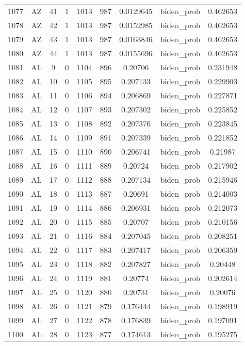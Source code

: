 \documentclass[12pt,a4paper]{article}
\begin{document}
\begin{tabular}{r|cccccccc}
	1077 & AZ & 41 & 1 & 1013 & 987 & 0.0129645 & biden\_prob & 0.462653 \\
	1078 & AZ & 42 & 1 & 1013 & 987 & 0.0152985 & biden\_prob & 0.462653 \\
	1079 & AZ & 43 & 1 & 1013 & 987 & 0.0163846 & biden\_prob & 0.462653 \\
	1080 & AZ & 44 & 1 & 1013 & 987 & 0.0155696 & biden\_prob & 0.462653 \\
	1081 & AL & 9 & 0 & 1104 & 896 & 0.20706 & biden\_prob & 0.231948 \\
	1082 & AL & 10 & 0 & 1105 & 895 & 0.207133 & biden\_prob & 0.229903 \\
	1083 & AL & 11 & 0 & 1106 & 894 & 0.206869 & biden\_prob & 0.227871 \\
	1084 & AL & 12 & 0 & 1107 & 893 & 0.207302 & biden\_prob & 0.225852 \\
	1085 & AL & 13 & 0 & 1108 & 892 & 0.207376 & biden\_prob & 0.223845 \\
	1086 & AL & 14 & 0 & 1109 & 891 & 0.207339 & biden\_prob & 0.221852 \\
	1087 & AL & 15 & 0 & 1110 & 890 & 0.206741 & biden\_prob & 0.21987 \\
	1088 & AL & 16 & 0 & 1111 & 889 & 0.20724 & biden\_prob & 0.217902 \\
	1089 & AL & 17 & 0 & 1112 & 888 & 0.207134 & biden\_prob & 0.215946 \\
	1090 & AL & 18 & 0 & 1113 & 887 & 0.20691 & biden\_prob & 0.214003 \\
	1091 & AL & 19 & 0 & 1114 & 886 & 0.206931 & biden\_prob & 0.212073 \\
	1092 & AL & 20 & 0 & 1115 & 885 & 0.20707 & biden\_prob & 0.210156 \\
	1093 & AL & 21 & 0 & 1116 & 884 & 0.207045 & biden\_prob & 0.208251 \\
	1094 & AL & 22 & 0 & 1117 & 883 & 0.207417 & biden\_prob & 0.206359 \\
	1095 & AL & 23 & 0 & 1118 & 882 & 0.207827 & biden\_prob & 0.20448 \\
	1096 & AL & 24 & 0 & 1119 & 881 & 0.20774 & biden\_prob & 0.202614 \\
	1097 & AL & 25 & 0 & 1120 & 880 & 0.20731 & biden\_prob & 0.20076 \\
	1098 & AL & 26 & 0 & 1121 & 879 & 0.176444 & biden\_prob & 0.198919 \\
	1099 & AL & 27 & 0 & 1122 & 878 & 0.176839 & biden\_prob & 0.197091 \\
	1100 & AL & 28 & 0 & 1123 & 877 & 0.174613 & biden\_prob & 0.195275 \\

\end{tabular}
\end{document}
